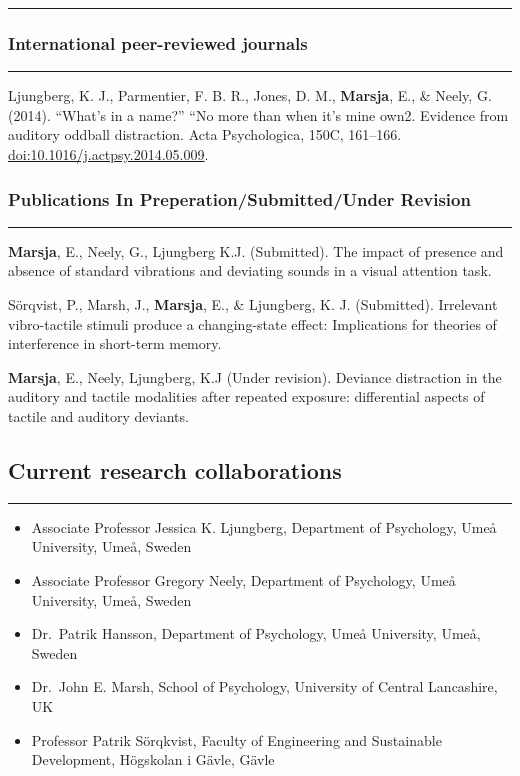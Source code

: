 \documentclass[]{article}
\providecommand{\tightlist}{%
  \setlength{\itemsep}{0pt}\setlength{\parskip}{0pt}}
\begin{document}
\hrule

\subsubsection{International peer-reviewed
journals}\label{international-peer-reviewed-journals}

\hrule

Ljungberg, K. J., Parmentier, F. B. R., Jones, D. M., \textbf{Marsja},
E., \& Neely, G. (2014). ``What's in a name?'' ``No more than when it's
mine own2. Evidence from auditory oddball distraction. Acta
Psychologica, 150C, 161--166. \url{doi:10.1016/j.actpsy.2014.05.009}.

\subsubsection{Publications In Preperation/Submitted/Under
Revision}\label{publications-in-preperationsubmittedunder-revision}

\hrule

\textbf{Marsja}, E., Neely, G., Ljungberg K.J. (Submitted). The impact
of presence and absence of standard vibrations and deviating sounds in a
visual attention task.

Sörqvist, P., Marsh, J., \textbf{Marsja}, E., \& Ljungberg, K. J.
(Submitted). Irrelevant vibro-tactile stimuli produce a changing-state
effect: Implications for theories of interference in short-term memory.

\textbf{Marsja}, E., Neely, Ljungberg, K.J (Under revision). Deviance
distraction in the auditory and tactile modalities after repeated
exposure: differential aspects of tactile and auditory deviants.

\subsection{Current research
collaborations}\label{current-research-collaborations}

\hrule

\begin{itemize}
\tightlist
\item
  Associate Professor Jessica K. Ljungberg, Department of Psychology,
  Umeå University, Umeå, Sweden
\item
  Associate Professor Gregory Neely, Department of Psychology, Umeå
  University, Umeå, Sweden
\item
  Dr.~Patrik Hansson, Department of Psychology, Umeå University, Umeå,
  Sweden
\item
  Dr.~John E. Marsh, School of Psychology, University of Central
  Lancashire, UK
\item
  Professor Patrik Sörqkvist, Faculty of Engineering and Sustainable
  Development, Högskolan i Gävle, Gävle
\end{itemize}
\end{document}
